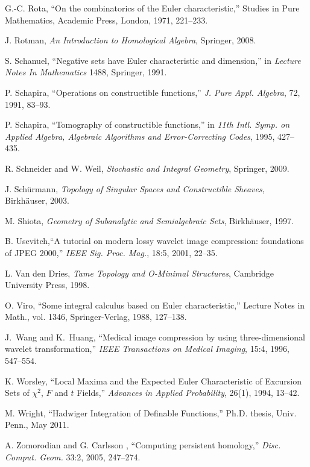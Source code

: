 \documentclass{psapm-l}
\theoremstyle{definition}
\theoremstyle{remark}
\numberwithin{equation}{section}
\begin{document}
{\begin{thebibliography}{A}
 G.-C. Rota, ``On the combinatorics of the Euler characteristic,'' Studies in Pure Mathematics, Academic Press, London, 1971, 221--233.

 J. Rotman, {\em An Introduction to Homological Algebra}, Springer, 2008.

 S. Schanuel, ``Negative sets have Euler characteristic and dimension,'' in {\em Lecture Notes In Mathematics} 1488, Springer, 1991.

 P. Schapira, ``Operations on constructible functions,'' {\em J. Pure Appl. Algebra}, 72, 1991, 83--93.

 P. Schapira, ``Tomography of constructible functions,'' in  {\em 11th Intl. Symp. on Applied Algebra, Algebraic Algorithms and Error-Correcting Codes}, 1995, 427--435.

 R. Schneider and W. Weil, {\em Stochastic and Integral Geometry}, Springer, 2009.

 J. Sch\"urmann, {\em Topology of Singular Spaces and Constructible Sheaves}, Birkh\"auser, 2003.

 M. Shiota, {\em Geometry of Subanalytic and Semialgebraic Sets}, Birkh\"auser, 1997.

 B. Usevitch,``A tutorial on modern lossy wavelet image compression: foundations of JPEG 2000,'' {\em IEEE Sig. Proc. Mag.}, 18:5, 2001,  22--35.

 L. Van den Dries, {\em Tame Topology and O-Minimal Structures}, Cambridge University Press, 1998.

 O. Viro, ``Some integral calculus based on Euler characteristic,'' Lecture Notes in Math., vol. 1346, Springer-Verlag, 1988, 127--138.

 J.~Wang and K.~Huang, ``Medical image compression by using three-dimensional wavelet transformation,'' {\em IEEE Transactions on Medical Imaging}, 15:4, 1996, 547--554.

 K. Worsley, ``Local Maxima and the Expected Euler Characteristic of Excursion Sets of $\chi ^{2}$, $F$ and $t$ Fields,'' {\em Advances in Applied Probability}, 26(1), 1994, 13--42.

 M. Wright, ``Hadwiger Integration of Definable Functions,'' Ph.D. thesis, Univ. Penn., May 2011.

 A. Zomorodian and G. Carlsson , ``Computing persistent homology,'' {\em Disc. Comput. Geom.} 33:2, 2005, 247--274.

\end{thebibliography}

}
\end{document}
